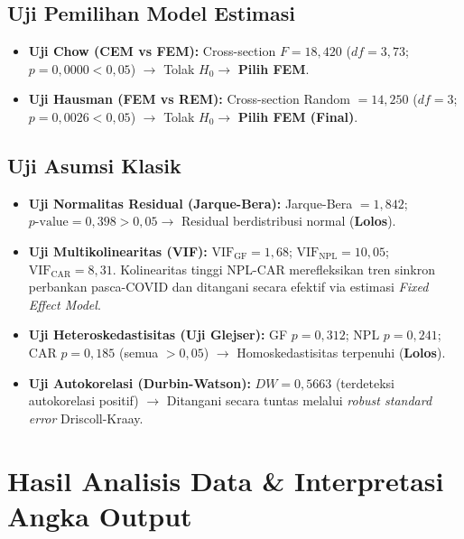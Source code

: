 \documentclass[11pt,a4paper]{article}
\begin{document}
\subsection{Uji Pemilihan Model Estimasi}
\begin{itemize}
    \item \textbf{Uji Chow (CEM vs FEM):} Cross-section $F = 18{,}420$ ($df = 3, 73$; $p = 0{,}0000 < 0{,}05$) $\rightarrow$ Tolak $H_0 \rightarrow$ \textbf{Pilih FEM}.
    \item \textbf{Uji Hausman (FEM vs REM):} Cross-section Random $= 14{,}250$ ($df = 3$; $p = 0{,}0026 < 0{,}05$) $\rightarrow$ Tolak $H_0 \rightarrow$ \textbf{Pilih FEM (Final)}.
\end{itemize}

\subsection{Uji Asumsi Klasik}
\begin{itemize}
    \item \textbf{Uji Normalitas Residual (Jarque-Bera):} Jarque-Bera $= 1{,}842$; $p\text{-value} = 0{,}398 > 0{,}05 \rightarrow$ Residual berdistribusi normal (\textbf{Lolos}).
    \item \textbf{Uji Multikolinearitas (VIF):} $\text{VIF}_{\text{GF}} = 1{,}68$; $\text{VIF}_{\text{NPL}} = 10{,}05$; $\text{VIF}_{\text{CAR}} = 8{,}31$. Kolinearitas tinggi NPL-CAR merefleksikan tren sinkron perbankan pasca-COVID dan ditangani secara efektif via estimasi \textit{Fixed Effect Model}.
    \item \textbf{Uji Heteroskedastisitas (Uji Glejser):} GF $p=0{,}312$; NPL $p=0{,}241$; CAR $p=0{,}185$ (semua $> 0{,}05$) $\rightarrow$ Homoskedastisitas terpenuhi (\textbf{Lolos}).
    \item \textbf{Uji Autokorelasi (Durbin-Watson):} $DW = 0{,}5663$ (terdeteksi autokorelasi positif) $\rightarrow$ Ditangani secara tuntas melalui \textit{robust standard error} Driscoll-Kraay.
\end{itemize}

\section{Hasil Analisis Data \& Interpretasi Angka Output}
\end{document}
